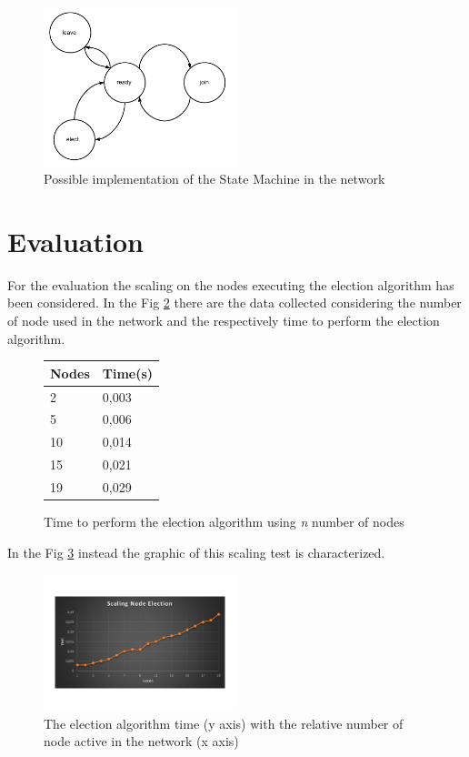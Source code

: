 \documentclass[11pt,conference]{IEEEtran}
\begin{document}
\begin{figure}[h!]
  \centering
    \includegraphics[width=0.5\textwidth]{state_machine}
    \caption{Possible implementation of the State Machine in the network}
    \label{fig:state_machine}
\end{figure}


\section{Evaluation}

For the evaluation the scaling on the nodes executing the election algorithm has been considered.
In the Fig \ref{tab:scaling} there are the data collected considering the number of node used in the network and the respectively time to perform the election algorithm. 
\begin{figure}[h!]
\centering
\caption{Time to perform the election algorithm using \textit{n} number of nodes}
\begin{tabular}[H]{ | l | l | }
\hline
	Nodes & Time(s) \\ \hline
	2 & 0,003 \\ \hline
	5 & 0,006 \\ \hline
	10 & 0,014 \\ \hline
	15 & 0,021 \\ \hline
	19 & 0,029 \\ \hline
\end{tabular}
\label{tab:scaling}
\end{figure}

In the Fig \ref{fig:scaling} instead the graphic of this scaling test is characterized.


\begin{figure}[h!]
  \centering
    \includegraphics[width=0.5\textwidth]{scaling}
    \caption{The election algorithm time (y axis) with the relative number of node active in the network (x axis)}
    \label{fig:scaling}
\end{figure}
\end{document}
